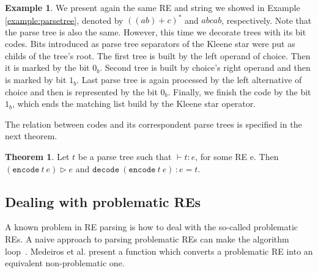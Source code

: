\documentclass[review]{elsarticle}
\newcommand{\inl}{\ensuremath{\texttt{inl}}}
\newcommand{\inr}{\ensuremath{\texttt{inr}}}
\newcommand{\code}{\ensuremath{\texttt{encode}}}
\newcommand{\decodee}{\ensuremath{\texttt{decode}}}
\theoremstyle{definition}
\newtheorem{Theorem}{Theorem}
\newtheorem{Example}{Example}
\begin{document}
\begin{Example}
We present again the same RE and string we showed in Example \ref{example:parsetree},
denoted by $((ab) + c)^*$ and $abcab$, respectively. Note that the parse tree is also the same.
However, this time we decorate trees with its bit codes. Bits introduced as
parse tree separators of the Kleene star were put as childs of the tree's root.
The first tree is built by the left operand of choice. Then it is marked by the
bit $0_b$. Second tree is built by choice's right operand and then is marked by
bit $1_b$. Last parse tree is again processed by the left
alternative of choice and then is represented by the bit $0_b$. Finally, we
finish the code by the bit $1_b$, which ends the matching list build by the
Kleene star operator.

\begin{center}
\end{center}

\end{Example}


The relation between codes and its correspondent parse trees is specified in the next
theorem.

\begin{Theorem}
  Let $t$ be a parse tree such that $\vdash t : e$, for some RE e. Then $(\code\: t\: e) \rhd e$ and
  $\decodee\:(\code\: t\: e)\,: e = t$.
\end{Theorem}


\subsection{Dealing with problematic REs}\label{subsection:problematic}

A known problem in RE parsing is how to deal with the so-called problematic REs. A naive approach to 
parsing problematic REs can make the algorithm loop~\cite{Frisch2004}. Medeiros et al. \cite{Medeiros14}
present a function which converts a problematic RE into an equivalent non-problematic one.
\end{document}
